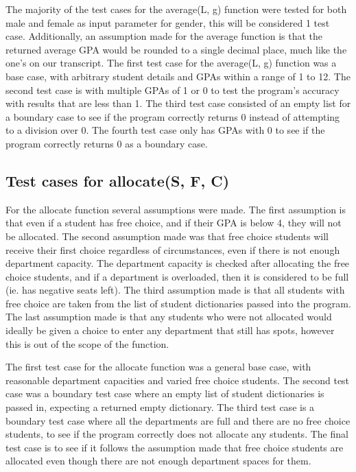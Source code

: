 \documentclass[12pt]{article}
\begin{document}
The majority of the test cases for the average(L, g) function were tested for both male and female as input parameter for gender, this will be considered 1 test case. Additionally, an assumption made for the average function is that the returned average GPA would be rounded to a single decimal place, much like the one's on our transcript.  The first test case for the average(L, g) function was a base case, with arbitrary student details and GPAs within a range of 1 to 12. The second test case is with multiple GPAs of 1 or 0 to test the program's accuracy with results that are less than 1. The third test case consisted of an empty list for a boundary case to see if the program correctly returns 0 instead of attempting to a division over 0. The fourth test case only has GPAs with 0 to see if the program correctly returns 0 as a boundary case.

\subsection{Test cases for allocate(S, F, C)}

For the allocate function several assumptions were made. The first assumption is that even if a student has free choice, and if their GPA is below 4, they will not be allocated. The second assumption made was that free choice students will receive their first choice regardless of circumstances, even if there is not enough department capacity. The department capacity is checked after allocating the free choice students, and if a department is overloaded, then it is considered to be full (ie. has negative seats left). The third assumption made is that all students with free choice are taken from the list of student dictionaries passed into the program. The last assumption made is that any students who were not allocated would ideally be given a choice to enter any department that still has spots, however this is out of the scope of the function.

The first test case for the allocate function was a general base case, with reasonable department capacities and varied free choice students. The second test case was a boundary test case where an empty list of student dictionaries is passed in, expecting a returned empty dictionary. The third test case is a boundary test case where all the departments are full and there are no free choice students, to see if the program correctly does not allocate any students.  The final test case is to see if it follows the assumption made that free choice students are allocated even though there are not enough department spaces for them. 
\end{document}

